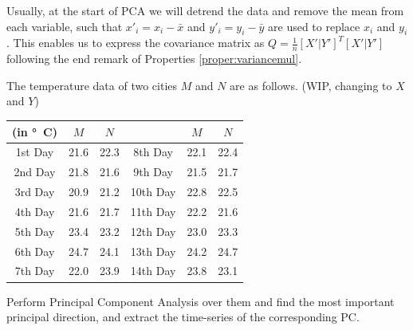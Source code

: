 Usually, at the start of PCA we will detrend the data and remove the mean from each variable, such that $x'_i = x_i - \bar{x}$ and $y'_i = y_i - \bar{y}$ are used to replace $x_i$ and $y_i$. This enables us to express the covariance matrix as $Q = \frac{1}{n}[X'|Y']^T[X'|Y']$ following the end remark of Properties \ref{proper:variancemul}. 
\begin{exmp}
\label{exmp:tempPCA}
The temperature data of two cities $M$ and $N$ are as follows. (WIP, changing to $X$ and $Y$)
\begin{center}
\begin{tabular}{|c|c|c|c|c|c|}
\hline
(in \si{\degree C}) & $M$ & $N$ & & $M$ & $N$ \\
\hline
1st Day & 21.6 & 22.3 & 8th Day & 22.1 & 22.4 \\
\hline
2nd Day & 21.8 & 21.6 & 9th Day & 21.5 & 21.7 \\
\hline
3rd Day & 20.9 & 21.2 & 10th Day & 22.8 & 22.5 \\
\hline
4th Day & 21.6 & 21.7 & 11th Day & 22.2 & 21.6 \\
\hline
5th Day & 23.4 & 23.2 & 12th Day & 23.0 & 23.3 \\
\hline 
6th Day & 24.7 & 24.1 & 13th Day & 24.2 & 24.7 \\
\hline 
7th Day & 22.0 & 23.9 & 14th Day & 23.8 & 23.1 \\
\hline
\end{tabular}
\end{center}
Perform Principal Component Analysis over them and find the most important principal direction, and extract the time-series of the corresponding PC.
\end{exmp}

